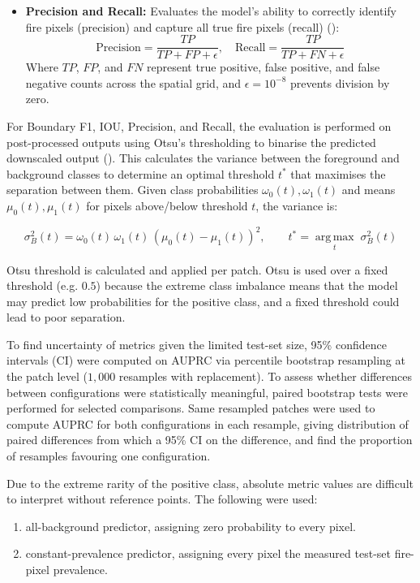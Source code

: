 \documentclass[a4paper, 11pt]{article} %
\begin{document}
\begin{itemize}
    \item \textbf{Precision and Recall:} Evaluates the model's ability to correctly identify fire pixels (precision) and capture all true fire pixels (recall) (\cite{saitoPrecisionRecallPlotMore2015}):
    \begin{equation}\label{eq:precision_recall}
        \text{Precision} = \frac{TP}{TP + FP + \epsilon}, \quad \text{Recall} = \frac{TP}{TP + FN + \epsilon}
    \end{equation}
    Where $TP$, $FP$, and $FN$ represent true positive, false positive, and false negative counts across the spatial grid, and $\epsilon = 10^{-8}$ prevents division by zero.
\end{itemize}

For Boundary F1, IOU, Precision, and Recall, the evaluation is performed on post-processed outputs using Otsu's thresholding to binarise the predicted downscaled output (\cite{zhangImageSegmentationBased2008}). This calculates the variance between the foreground and background classes to determine an optimal threshold $t^*$ that maximises the separation between them. Given class probabilities $\omega_0(t), \omega_1(t)$ and means $\mu_0(t), \mu_1(t)$ for pixels above/below threshold $t$, the variance is:

\begin{equation}\label{eq:otsu}
    \sigma_B^2(t) = \omega_0(t)\,\omega_1(t)\,\left(\mu_0(t) - \mu_1(t)\right)^2, \qquad t^* = \operatorname*{arg\,max}_{t} \; \sigma_B^2(t)
\end{equation}

Otsu threshold is calculated and applied per patch. Otsu is used over a fixed threshold (e.g. $0.5$) because the extreme class imbalance means that the model may predict low probabilities for the positive class, and a fixed threshold could lead to poor separation.

To find uncertainty of metrics given the limited test-set size, 95\% confidence intervals (CI) were computed on AUPRC via percentile bootstrap resampling at the patch level ($1,000$ resamples with replacement). To assess whether differences between configurations were statistically meaningful, paired bootstrap tests were performed for selected comparisons. Same resampled patches were used to compute AUPRC for both configurations in each resample, giving distribution of paired differences from which a 95\% CI on the difference, and find the proportion of resamples favouring one configuration.

Due to the extreme rarity of the positive class, absolute metric values are difficult to interpret without reference points. The following were used:
\begin{enumerate}
    \item all-background predictor, assigning zero probability to every pixel.
    \item constant-prevalence predictor, assigning every pixel the measured test-set fire-pixel prevalence.
\end{enumerate}
\end{document}
